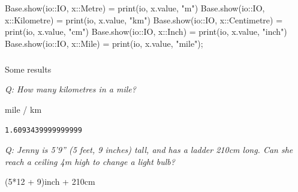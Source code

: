 \documentclass[
]{article}
\makeatletter
\let\oldsubparagraph\subparagraph
\renewcommand{\subparagraph}{
    \@ifstar
      \xxxSubParagraphStar
      \xxxSubParagraphNoStar
  }
\newcommand{\xxxSubParagraphStar}[1]{\oldsubparagraph*{#1}\mbox{}}
\newcommand{\xxxSubParagraphNoStar}[1]{\oldsubparagraph{#1}\mbox{}}
\newenvironment{Shaded}{\begin{snugshade}}{\end{snugshade}}
\newcommand{\BuiltInTok}[1]{\textcolor[rgb]{0.00,0.23,0.31}{#1}}
\newcommand{\DataTypeTok}[1]{\textcolor[rgb]{0.68,0.00,0.00}{#1}}
\newcommand{\FloatTok}[1]{\textcolor[rgb]{0.68,0.00,0.00}{#1}}
\newcommand{\FunctionTok}[1]{\textcolor[rgb]{0.28,0.35,0.67}{#1}}
\newcommand{\NormalTok}[1]{\textcolor[rgb]{0.00,0.23,0.31}{#1}}
\newcommand{\OperatorTok}[1]{\textcolor[rgb]{0.37,0.37,0.37}{#1}}
\newcommand{\StringTok}[1]{\textcolor[rgb]{0.13,0.47,0.30}{#1}}
\makeatother
\begin{document}
\begin{Shaded}
\begin{Highlighting}[]
\BuiltInTok{Base}\NormalTok{.}\FunctionTok{show}\NormalTok{(io}\OperatorTok{::}\DataTypeTok{IO}\NormalTok{, x}\OperatorTok{::}\DataTypeTok{Metre}\NormalTok{) }\OperatorTok{=} \FunctionTok{print}\NormalTok{(io, x.value, }\StringTok{"m"}\NormalTok{)}
\BuiltInTok{Base}\NormalTok{.}\FunctionTok{show}\NormalTok{(io}\OperatorTok{::}\DataTypeTok{IO}\NormalTok{, x}\OperatorTok{::}\DataTypeTok{Kilometre}\NormalTok{) }\OperatorTok{=} \FunctionTok{print}\NormalTok{(io, x.value, }\StringTok{"km"}\NormalTok{)}
\BuiltInTok{Base}\NormalTok{.}\FunctionTok{show}\NormalTok{(io}\OperatorTok{::}\DataTypeTok{IO}\NormalTok{, x}\OperatorTok{::}\DataTypeTok{Centimetre}\NormalTok{) }\OperatorTok{=} \FunctionTok{print}\NormalTok{(io, x.value, }\StringTok{"cm"}\NormalTok{)}
\BuiltInTok{Base}\NormalTok{.}\FunctionTok{show}\NormalTok{(io}\OperatorTok{::}\DataTypeTok{IO}\NormalTok{, x}\OperatorTok{::}\DataTypeTok{Inch}\NormalTok{) }\OperatorTok{=} \FunctionTok{print}\NormalTok{(io, x.value, }\StringTok{"inch"}\NormalTok{)}
\BuiltInTok{Base}\NormalTok{.}\FunctionTok{show}\NormalTok{(io}\OperatorTok{::}\DataTypeTok{IO}\NormalTok{, x}\OperatorTok{::}\DataTypeTok{Mile}\NormalTok{) }\OperatorTok{=} \FunctionTok{print}\NormalTok{(io, x.value, }\StringTok{"mile"}\NormalTok{);}
\end{Highlighting}
\end{Shaded}

\subparagraph{Some results}\label{some-results}

\emph{Q: How many kilometres in a mile?}

\begin{Shaded}
\begin{Highlighting}[]
\NormalTok{mile }\OperatorTok{/}\NormalTok{ km}
\end{Highlighting}
\end{Shaded}

\begin{verbatim}
1.6093439999999999
\end{verbatim}

\emph{Q: Jenny is 5'9'' (5 feet, 9 inches) tall, and has a ladder 210cm
long. Can she reach a ceiling 4m high to change a light bulb?}

\begin{Shaded}
\begin{Highlighting}[]
\NormalTok{(}\FloatTok{5}\OperatorTok{*}\FloatTok{12} \OperatorTok{+} \FloatTok{9}\NormalTok{)inch }\OperatorTok{+} \FloatTok{210}\NormalTok{cm}
\end{Highlighting}
\end{Shaded}
\end{document}
